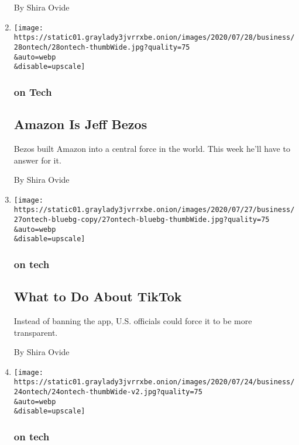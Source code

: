 \begin{enumerate}
  By Shira Ovide
\item
  \href{/2020/07/28/technology/amazon-jeff-bezos.html}{}

  \texttt{[image: https://static01.graylady3jvrrxbe.onion/images/2020/07/28/business/28ontech/28ontech-thumbWide.jpg?quality=75\\\&auto=webp\\\&disable=upscale]}

  \hypertarget{on-tech-4}{%
  \subsubsection{on Tech}\label{on-tech-4}}

  \hypertarget{amazon-is-jeff-bezos}{%
  \subsection{Amazon Is Jeff Bezos}\label{amazon-is-jeff-bezos}}

  Bezos built Amazon into a central force in the world. This week he'll
  have to answer for it.

  By Shira Ovide
\item
  \href{/2020/07/27/technology/tiktok-data-privacy.html}{}

  \texttt{[image: https://static01.graylady3jvrrxbe.onion/images/2020/07/27/business/27ontech-bluebg-copy/27ontech-bluebg-thumbWide.jpg?quality=75\\\&auto=webp\\\&disable=upscale]}

  \hypertarget{on-tech-5}{%
  \subsubsection{on tech}\label{on-tech-5}}

  \hypertarget{what-to-do-about-tiktok}{%
  \subsection{What to Do About TikTok}\label{what-to-do-about-tiktok}}

  Instead of banning the app, U.S. officials could force it to be more
  transparent.

  By Shira Ovide
\item
  \href{/2020/07/24/technology/digital-habits.html}{}

  \texttt{[image: https://static01.graylady3jvrrxbe.onion/images/2020/07/24/business/24ontech/24ontech-thumbWide-v2.jpg?quality=75\\\&auto=webp\\\&disable=upscale]}

  \hypertarget{on-tech-6}{%
  \subsubsection{on tech}\label{on-tech-6}}


\end{enumerate}
